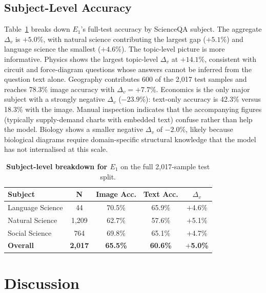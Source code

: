 \documentclass{article}
\begin{document}
\subsection{Subject-Level Accuracy}

Table~\ref{tab:subject} breaks down $E_1$'s full-test accuracy by ScienceQA subject. The aggregate $\Delta_v$ is $+5.0\%$, with natural science contributing the largest gap ($+5.1\%$) and language science the smallest ($+4.6\%$). The topic-level picture is more informative. Physics shows the largest topic-level $\Delta_v$ at $+14.1\%$, consistent with circuit and force-diagram questions whose answers cannot be inferred from the question text alone. Geography contributes 600 of the 2{,}017 test samples and reaches 78.3\% image accuracy with $\Delta_v = +7.7\%$. Economics is the only major subject with a strongly negative $\Delta_v$ ($-23.9\%$): text-only accuracy is 42.3\% versus 18.3\% with the image. Manual inspection indicates that the accompanying figures (typically supply-demand charts with embedded text) confuse rather than help the model. Biology shows a smaller negative $\Delta_v$ of $-2.0\%$, likely because biological diagrams require domain-specific structural knowledge that the model has not internalised at this scale.

\begin{table}[h]
\centering
\caption{\textbf{Subject-level breakdown for $E_1$} on the full 2{,}017-sample test split.}
\label{tab:subject}
\small
\begin{tabular}{lcccc}
\toprule
\textbf{Subject} & \textbf{N} & \textbf{Image Acc.} & \textbf{Text Acc.} & $\Delta_v$ \\
\midrule
Language Science & 44    & 70.5\% & 65.9\% & $+$4.6\% \\
Natural Science  & 1{,}209 & 62.7\% & 57.6\% & $+$5.1\% \\
Social Science   & 764   & 69.8\% & 65.1\% & $+$4.7\% \\
\midrule
\textbf{Overall} & \textbf{2{,}017} & \textbf{65.5\%} & \textbf{60.6\%} & \textbf{$+$5.0\%} \\
\bottomrule
\end{tabular}
\end{table}

\section{Discussion}
\label{sec:disc}
\end{document}
